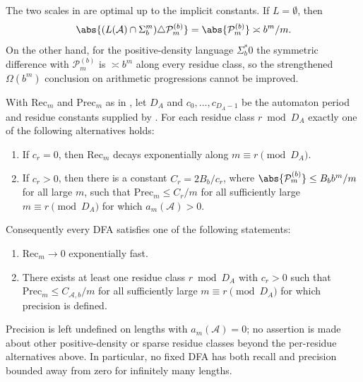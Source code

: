 \begin{remark}\label{rem:prime-diff-sharp}
  The two scales in  are optimal up
  to the implicit constants. If \(L=\emptyset\), then
  \[
    \abs{(L(\mathcal A)\cap\Sigma_b^m)\triangle\mathcal P_m^{(b)}}
    =\abs{\mathcal P_m^{(b)}}\asymp b^m/m .
  \]
  On the other hand, for the positive-density language
  \(\Sigma_b^\ast0\) the symmetric difference with
  \(\mathcal P_m^{(b)}\) is \(\asymp b^m\) along every residue class,
  so the strengthened \(\Omega(b^m)\) conclusion on arithmetic
  progressions cannot be improved.
\end{remark}

\begin{corollary}
  \label{cor:dfa-prime-recall-precision}
  With \(\mathrm{Rec}_m\) and \(\mathrm{Prec}_m\) as in
  , let \(D_A\) and
  \(c_0,\dots,c_{D_A-1}\) be the automaton period and residue constants supplied by
  . For each residue class
  \(r\bmod D_A\) exactly one of the following alternatives holds:
  \begin{enumerate}[label=\textup{(\alph*)}]
    \item If \(c_r=0\), then \(\mathrm{Rec}_m\) decays exponentially
    along \(m\equiv r\pmod {D_A}\).
    \item If \(c_r>0\), then there is a constant
    \(C_r=2B_b/c_r\), where
    \(\abs{\mathcal P_m^{(b)}}\le B_b b^m/m\) for all large \(m\),
    such that \(\mathrm{Prec}_m\le C_r/m\) for all sufficiently large
    \(m\equiv r\pmod {D_A}\) for which \(a_m(\mathcal A)>0\).
  \end{enumerate}
  Consequently every DFA satisfies one of the following statements:
  \begin{enumerate}[label=\textup{(\roman*)}]
    \item \(\mathrm{Rec}_m\to 0\) exponentially fast.
    \item There exists at least one residue class
    \(r\bmod D_A\) with \(c_r>0\) such that
    \(\mathrm{Prec}_m\le C_{\mathcal A,b}/m\) for all sufficiently large
    \(m\equiv r\pmod {D_A}\) for which precision is defined.
  \end{enumerate}
  Precision is left undefined on lengths with \(a_m(\mathcal A)=0\);
  no assertion is made about other positive-density or sparse residue
  classes beyond the per-residue alternatives above.
  In particular, no fixed DFA has both recall and precision bounded
  away from zero for infinitely many lengths.
\end{corollary}

